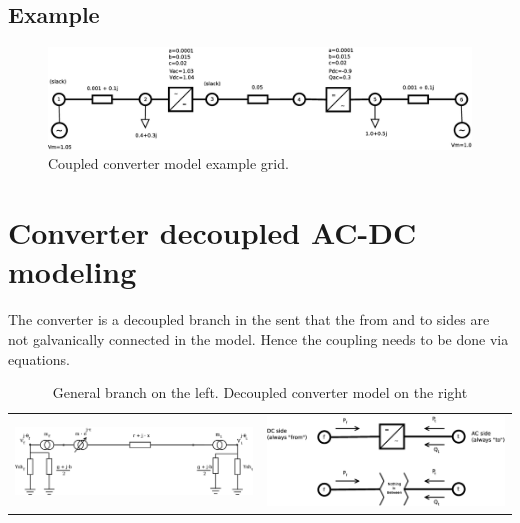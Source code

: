 \documentclass[11pt]{article}
\begin{document}
	\subsection{Example}
	
	\begin{figure}[h!]
		\centering
		\includegraphics[width=1.0\linewidth]{acdc_6bus_diagram_fubm}
		\caption{Coupled converter model example grid.}
		\label{fig:acdc6busdiagram_fubm}
	\end{figure}

	

	\newpage
	\section{Converter decoupled AC-DC modeling}
	
	The converter is a decoupled branch in the sent that the from and to sides are not galvanically connected in the model.
	Hence the coupling needs to be done via equations.
	
	\begin{table}[h!]
	\begin{tabular}{cc} %
		\includegraphics[width=0.55\linewidth]{branch.eps} &
		\includegraphics[width=0.4\linewidth]{decoupled_converter_model.eps} \\
	\end{tabular}
	\caption{General branch on the left. Decoupled converter model on the right}
	\label{table:branch_and_converter}
	\end{table}
	
\end{document}

